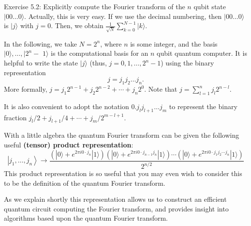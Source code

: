 
\begin{exercise}
    Exercise 5.2: Explicitly compute the Fourier transform of the $n$ qubit state $|00 \ldots 0\rangle$. Actually, this is very easy. If we use the decimal numbering, then $|00 \ldots 0\rangle$ is $|j\rangle$ with $j=0$. Then, we obtain $\frac{1}{\sqrt{N}} \sum_{k=0}^{N-1}|k\rangle$.
\end{exercise}

In the following, we take $N=2^{n}$, where $n$ is some integer, and the basis $|0\rangle, \ldots, \mid 2^{n}-$ $1\rangle$ is the computational basis for an $n$ qubit quantum computer. It is helpful to write the state $|j\rangle$ (thus, $j=0,1,\dots,2^n-1$) using the binary representation 
$$
j=j_{1} j_{2} \ldots j_{n}.
$$
More formally, $j=j_{1} 2^{n-1}+j_{2} 2^{n-2}+\cdots+j_{n} 2^{0}$. Note that $j=\sum_{l=1}^n j_l 2^{n-l}.$

It is also convenient to adopt the notation $0 . j_{l} j_{l+1} \ldots j_{m}$ to represent the  binary fraction $j_{l} / 2+j_{l+1} / 4+\cdots+j_{m} / 2^{m-l+1}.$ %

\begin{theorem}
    With a little algebra the quantum Fourier transform can be given the following useful \textbf{(tensor) product representation}:
\begin{equation*}
\left|j_{1}, \ldots, j_{n}\right\rangle \rightarrow \frac{\left(|0\rangle+e^{2 \pi i 0 \cdot j_{n}}|1\rangle\right)\left(|0\rangle+e^{2 \pi i 0 \cdot j_{n-1} j_{n}}|1\rangle\right) \cdots\left(|0\rangle+e^{2 \pi i 0 \cdot j_{1} j_{2} \cdots j_{n}}|1\rangle\right)}{2^{n / 2}} \tag{5.4}
\end{equation*}
This product representation is so useful that you may even wish to consider this to be the definition of the quantum Fourier transform. 
\end{theorem}

As we explain shortly this representation allows us to construct an efficient quantum circuit computing the Fourier transform, and provides insight into algorithms based upon the quantum Fourier transform.

